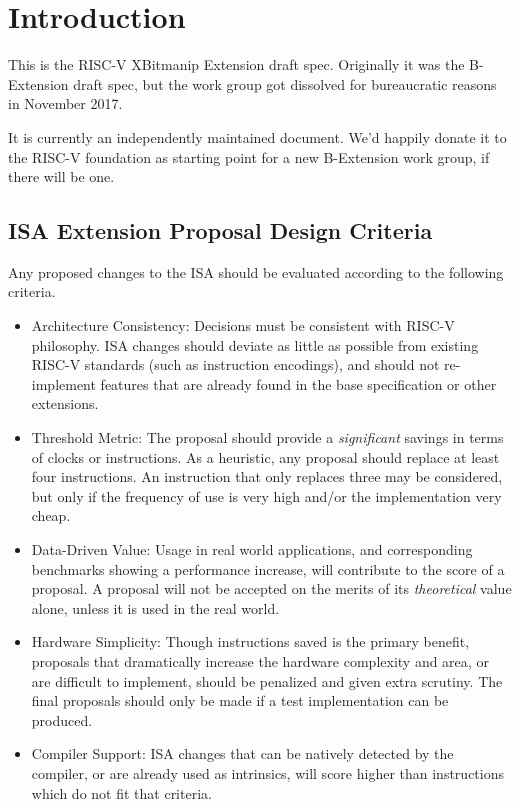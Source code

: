 \chapter{Introduction}

This is the RISC-V XBitmanip Extension draft spec. Originally it was the
B-Extension draft spec, but the work group got dissolved for bureaucratic
reasons in November 2017.

It is currently an independently maintained document. We'd happily donate
it to the RISC-V foundation as starting point for a new B-Extension work
group, if there will be one.

\section{ISA Extension Proposal Design Criteria}

Any proposed changes to the ISA should be evaluated according to the following
criteria.

\begin{itemize}
\item
  Architecture Consistency: Decisions must be consistent with RISC-V
  philosophy. ISA changes should deviate as little as possible from
  existing RISC-V standards (such as instruction encodings), and should
  not re-implement features that are already found in the base
  specification or other extensions.
\item
  Threshold Metric: The proposal should provide a \emph{significant}
  savings in terms of clocks or instructions. As a heuristic, any
  proposal should replace at least four instructions. An instruction
  that only replaces three may be considered, but only if the frequency
  of use is very high and/or the implementation very cheap.
\item
  Data-Driven Value: Usage in real world applications, and corresponding
  benchmarks showing a performance increase, will contribute to the
  score of a proposal. A proposal will not be accepted on the merits of
  its \emph{theoretical} value alone, unless it is used in the real
  world.
\item
  Hardware Simplicity: Though instructions saved is the primary benefit,
  proposals that dramatically increase the hardware complexity and area,
  or are difficult to implement, should be penalized and given extra
  scrutiny. The final proposals should only be made if a test
  implementation can be produced.
\item
  Compiler Support: ISA changes that can be natively detected by the
  compiler, or are already used as intrinsics, will score higher than
  instructions which do not fit that criteria.
\end{itemize}

